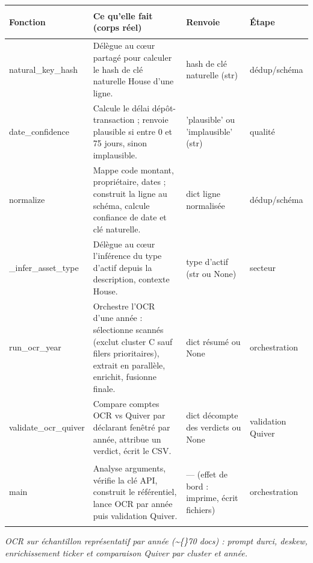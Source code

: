 \documentclass[11pt,a4paper]{article}
\makeatletter
\newenvironment{fnt}{%
  \par\footnotesize
  \setlength{\tabcolsep}{3pt}%
  \begin{longtable}{@{}>{\ttfamily\scriptsize\raggedright\arraybackslash}p{3.0cm} >{\raggedright\arraybackslash}p{7.5cm} >{\itshape\scriptsize\raggedright\arraybackslash}p{2.7cm} >{\scriptsize\raggedright\arraybackslash}p{1.85cm}@{}}
  \toprule
  \normalfont\bfseries\scriptsize Fonction & \bfseries\scriptsize Ce qu'elle fait (corps réel) &
  \normalfont\bfseries\scriptsize Renvoie & \normalfont\bfseries\scriptsize Étape\\
  \midrule\endhead
}{\bottomrule\end{longtable}\par}
\newcommand{\fnmod}[2]{\par\smallskip\noindent{\ttfamily\bfseries #1}\;\textmd{\itshape\small\textemdash{} #2}\par\nobreak\vspace{2pt}}
\makeatother
\begin{document}
\begin{fnt}
natural_\allowbreak key_\allowbreak hash & Délègue au cœur partagé pour calculer le hash de clé naturelle House d'une ligne. & hash de clé naturelle (str)\allowbreak{} & dédup/schéma \\
date_\allowbreak confidence & Calcule le délai dépôt-transaction ; renvoie plausible si entre 0 et 75 jours,\allowbreak{} sinon implausible. & 'plausible' ou 'implausible' (str)\allowbreak{} & qualité \\
normalize & Mappe code montant,\allowbreak{} propriétaire,\allowbreak{} dates ; construit la ligne au schéma,\allowbreak{} calcule confiance de date et clé naturelle. & dict ligne normalisée & dédup/schéma \\
_\allowbreak infer_\allowbreak asset_\allowbreak type & Délègue au cœur l'inférence du type d'actif depuis la description,\allowbreak{} contexte House. & type d'actif (str ou None)\allowbreak{} & secteur \\
run_\allowbreak ocr_\allowbreak year & Orchestre l'OCR d'une année : sélectionne scannés (exclut cluster C sauf filers prioritaires)\allowbreak{},\allowbreak{} extrait en parallèle,\allowbreak{} enrichit,\allowbreak{} fusionne finale. & dict résumé ou None & orchestration \\
validate_\allowbreak ocr_\allowbreak quiver & Compare comptes OCR vs Quiver par déclarant fenêtré par année,\allowbreak{} attribue un verdict,\allowbreak{} écrit le CSV. & dict décompte des verdicts ou None & validation Quiver \\
main & Analyse arguments,\allowbreak{} vérifie la clé API,\allowbreak{} construit le référentiel,\allowbreak{} lance OCR par année puis validation Quiver. & — (effet de bord : imprime,\allowbreak{} écrit fichiers)\allowbreak{} & orchestration \\
\end{fnt}
\fnmod{echantillon.py}{OCR sur échantillon représentatif par année (\textasciitilde\{\}70 docs) : prompt durci, deskew, enrichissement ticker et comparaison Quiver par cluster et année.}
\end{document}
